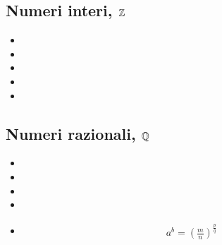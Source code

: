 \documentclass[letterpaper,10pt,italian]{jupyterBook}
\begin{document}
\subsection{Numeri interi, \protect\(\mathbb{Z}\protect\)}
\label{\detokenize{ch/set:numeri-interi-mathbb-z}}\label{\detokenize{ch/set:math-hs-set-numbers-z}}\begin{itemize}
\item {} 
\sphinxAtStartPar
{}

\item {} 
\sphinxAtStartPar
{}

\item {} 
\sphinxAtStartPar
{}

\item {} 
\sphinxAtStartPar
{}

\item {} 
\sphinxAtStartPar
{}

\end{itemize}


\subsection{Numeri razionali, \protect\(\mathbb{Q}\protect\)}
\label{\detokenize{ch/set:numeri-razionali-mathbb-q}}\label{\detokenize{ch/set:math-hs-set-numbers-q}}\begin{itemize}
\item {} 
\sphinxAtStartPar
{}

\item {} 
\sphinxAtStartPar
{}

\item {} 
\sphinxAtStartPar
{}

\item {} 
\sphinxAtStartPar
{}

\item {} 
\sphinxAtStartPar
{}
\begin{equation*}
\begin{split}a^b = \left( \frac{m}{n} \right)^{\frac{p}{q}}\end{split}
\end{equation*}
\end{itemize}
\end{document}
